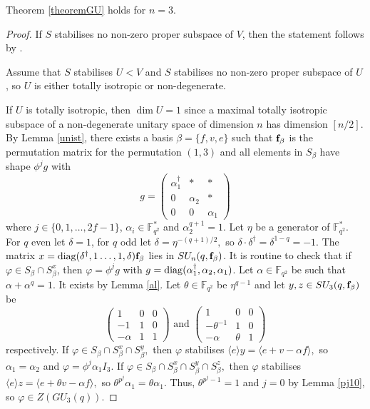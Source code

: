 \begin{Lem} \label{lemn4uni}
Theorem {\rm \ref{theoremGU}} holds for $n=3.$
\end{Lem}
\begin{proof}
If $S$  stabilises no non-zero proper subspace of $V$, then the statement follows by 
\cite[Theorem 1.1]{burness}.

\medskip

Assume that $S$ stabilises $U<V$ and $S$  stabilises no non-zero proper subspace of $U$, so  $U$ is either totally isotropic or non-degenerate.

 If $U$ is totally isotropic, then $\dim U=1$ since a maximal totally isotropic subspace of a non-degenerate unitary space of dimension $n$  has dimension $[n/2]$.  By Lemma \ref{unist}, there exists a basis $\beta=\{f,v,e\}$ such that ${\bf f}_{\beta}$ is the permutation matrix for the permutation $(1,3)$ and all elements in $S_{\beta}$ have shape $\phi^j g$ with
\begin{equation*}
g=\begin{pmatrix}
\alpha_1^{\dagger} &* &*\\
 0 & \alpha_2 &*\\
0& 0 & \alpha_1
\end{pmatrix}
\end{equation*}
where $j \in \{0,1 , \ldots, 2f-1\}$, $\alpha_i \in \mathbb{F}_{q^2}^*$ and $\alpha_2^{q+1}=1.$
 Let $\eta$ be a generator of $\mathbb{F}_{q^2}^*.$ For $q$  even let $\delta=1$, for $q$ odd let $\delta=\eta^{-(q+1)/2},$ so $\delta \cdot \delta^{\dagger}=\delta^{1-q}=-1.$
The matrix $x=\mathrm{diag}(\delta^{\dagger}, 1 \ldots, 1, \delta){\bf f}_{\beta}$
lies in $SU_n(q,{\bf f}_{\beta})$. It is routine to check that if $\varphi \in S_{\beta} \cap S_{\beta}^x$, then $\varphi= \phi^j g$ with $g=\mathrm{diag}(\alpha_1^{\dagger}, \alpha_2, \alpha_1)$.
Let $\alpha \in \mathbb{F}_{q^2}$ be such that $\alpha + \alpha^q =1.$ It exists by Lemma \ref{al}. Let $\theta \in \mathbb{F}_{q^2}$ be $\eta^{q-1}$ and let $y, z \in SU_3(q,{\bf f}_{\beta})$  be $$
\begin{pmatrix}
1 & 0& 0\\
 -1 & 1 &0\\
-\alpha& 1 & 1
\end{pmatrix} \text{ and }
\begin{pmatrix}
1 & 0& 0\\
 -\theta^{-1} & 1 &0\\
-\alpha& \theta & 1
\end{pmatrix} 
$$ respectively. If $\varphi \in S_{\beta} \cap S_{\beta}^x \cap S_{\beta}^y,$ then $\varphi$ stabilises $\langle e \rangle y= \langle e +v - \alpha f \rangle,$ so $\alpha_1=\alpha_2$ and $\varphi=\phi^j \alpha_1 I_3.$ If $\varphi \in S_{\beta} \cap S_{\beta}^x \cap S_{\beta}^y  \cap S_{\beta}^z,$ then $\varphi$ stabilises $\langle e \rangle z= \langle e +\theta v - \alpha f \rangle,$ so $\theta^{p^j}\alpha_1= \theta \alpha_1$. Thus, $\theta^{p^j-1}=1$ and $j=0$ by Lemma \ref{pj10}, so $\varphi \in Z(GU_3(q)).$


\end{proof}

